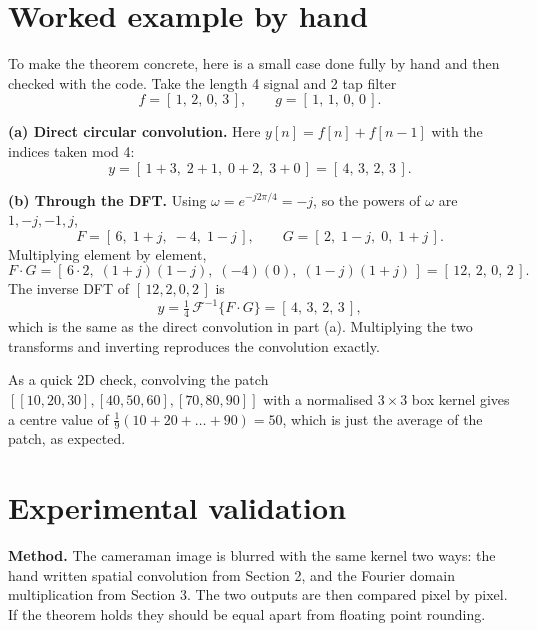 \documentclass[11pt]{article}
\begin{document}
\section{Worked example by hand}

To make the theorem concrete, here is a small case done fully by hand and then
checked with the code. Take the length 4 signal and 2 tap filter
\begin{equation}
f = [\,1,\, 2,\, 0,\, 3\,], \qquad g = [\,1,\, 1,\, 0,\, 0\,].
\end{equation}

\textbf{(a) Direct circular convolution.} Here $y[n] = f[n] + f[n-1]$ with the
indices taken mod 4:
\begin{equation}
y = [\,1{+}3,\; 2{+}1,\; 0{+}2,\; 3{+}0\,] = [\,4,\, 3,\, 2,\, 3\,].
\end{equation}

\textbf{(b) Through the DFT.} Using $\omega = e^{-j2\pi/4} = -j$, so the powers of
$\omega$ are $1, -j, -1, j$,
\begin{equation}
F = [\,6,\; 1{+}j,\; -4,\; 1{-}j\,], \qquad G = [\,2,\; 1{-}j,\; 0,\; 1{+}j\,].
\end{equation}
Multiplying element by element,
\begin{equation}
F\cdot G = [\,6\cdot 2,\; (1{+}j)(1{-}j),\; (-4)(0),\; (1{-}j)(1{+}j)\,]
        = [\,12,\, 2,\, 0,\, 2\,].
\end{equation}
The inverse DFT of $[\,12, 2, 0, 2\,]$ is
\begin{equation}
y = \tfrac{1}{4}\,\mathcal{F}^{-1}\{F\cdot G\} = [\,4,\, 3,\, 2,\, 3\,],
\end{equation}
which is the same as the direct convolution in part (a). Multiplying the two
transforms and inverting reproduces the convolution exactly.

As a quick 2D check, convolving the patch $[[10,20,30],[40,50,60],[70,80,90]]$
with a normalised $3\times3$ box kernel gives a centre value of
$\tfrac{1}{9}(10 + 20 + \dots + 90) = 50$, which is just the average of the
patch, as expected.

\section{Experimental validation}

\textbf{Method.} The cameraman image is blurred with the same kernel two ways: the
hand written spatial convolution from Section 2, and the Fourier domain
multiplication from Section 3. The two outputs are then compared pixel by pixel.
If the theorem holds they should be equal apart from floating point rounding.
\end{document}
